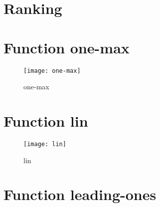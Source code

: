 \graphicspath{{../graphics/}}

\section{Ranking}

\begin{center}

\end{center}


\newpage

\section{Function one-max}

\begin{center}

\end{center}

\begin{center}

\end{center}

\begin{figure}[h]
\begin{center}
\texttt{[image: one-max]}
\caption{one-max}
\end{center}
\end{figure}

\newpage

\section{Function lin}

\begin{center}

\end{center}

\begin{center}

\end{center}

\begin{figure}[h]
\begin{center}
\texttt{[image: lin]}
\caption{lin}
\end{center}
\end{figure}

\newpage

\section{Function leading-ones}


